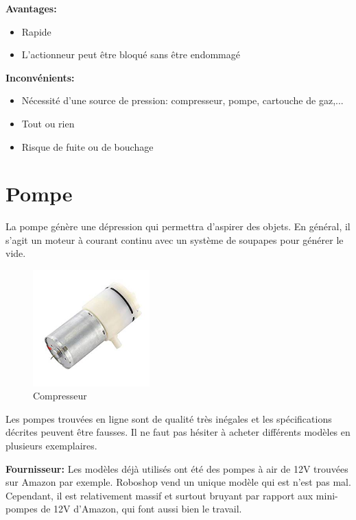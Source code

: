 \documentclass[a4paper, 11pt]{report}
\begin{document}
\textbf{Avantages:}
\begin{itemize}
\item Rapide
\item L'actionneur peut être bloqué sans être endommagé
\end{itemize}

\textbf{Inconvénients:}
\begin{itemize}
\item Nécessité d'une source de pression: compresseur, pompe, cartouche de gaz,...
\item Tout ou rien
\item Risque de fuite ou de bouchage
\end{itemize}

\section{Pompe}
La pompe génère une dépression qui permettra d'aspirer des objets. En général, il s'agit un moteur à courant continu avec un système de soupapes pour générer le vide.

\begin{figure}
\begin{centering}
\includegraphics[width=0.4\textwidth]{images/pompeAvide.jpeg}
\caption{Compresseur}
\par\end{centering}
\end{figure}

Les pompes trouvées en ligne sont de qualité très inégales et les spécifications décrites peuvent être fausses. Il ne faut pas hésiter à acheter différents modèles en plusieurs exemplaires. 

\textbf{Fournisseur:}
Les modèles déjà utilisés ont été des pompes à air de 12V trouvées sur Amazon par exemple. Roboshop vend un unique modèle qui est n'est pas mal. Cependant, il est relativement massif et surtout bruyant par rapport aux mini-pompes de 12V d'Amazon, qui font aussi bien le travail.
\end{document}
